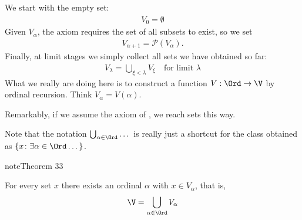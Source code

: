 \documentclass[letterpaper,10pt,english]{jupyterBook}
\begin{document}
\sphinxAtStartPar
We start with the empty set:
\begin{equation*}
\begin{split}
V_0 = \emptyset
\end{split}
\end{equation*}
\sphinxAtStartPar
Given \(V_\alpha\), the  axiom requires the set of all subsets to exist, so we set
\begin{equation*}
\begin{split} 
V_{\alpha+1} = \mathcal{P}(V_{\alpha}).
\end{split}
\end{equation*}
\sphinxAtStartPar
Finally, at limit stages we simply collect all sets we have obtained so far:
\begin{equation*}
\begin{split}
V_ \lambda =  \bigcup_{\xi < \lambda} V_\xi \quad \text{for limit } \lambda
\end{split}
\end{equation*}
\sphinxAtStartPar
What we really are doing here is to construct a function \(V: \Ord \to \V\) by ordinal recursion. Think \(V_\alpha = V(\alpha)\).

\sphinxAtStartPar
Remarkably, if we assume the axiom of , we reach  sets this way.

\begin{sphinxShadowBox}
\sphinxstylesidebartitle{}

\sphinxAtStartPar
Note that the notation \(\bigcup_{\alpha \in \Ord} \dots\) is really just a shortcut for the class obtained as \(\{ x \colon \exists \alpha \in \Ord \dots\}\).
\end{sphinxShadowBox}
\label{recursion:thm-von-Neumann}
\begin{sphinxadmonition}{note}{Theorem 33}



\sphinxAtStartPar
For every set \(x\) there exists an ordinal \(\alpha\) with \(x \in V_\alpha\), that is,
\begin{equation*}
\begin{split}
    \V = \bigcup_{\alpha \in \Ord} V_\alpha
\end{split}
\end{equation*}\end{sphinxadmonition}
\end{document}
